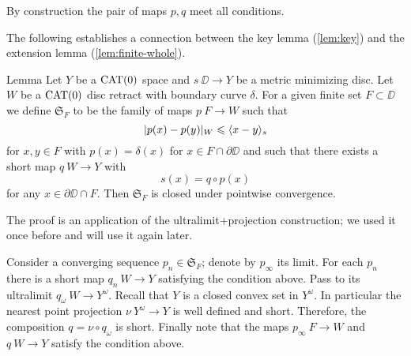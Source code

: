 By construction the pair of maps $p,q$ meet all conditions.
\qeds

The following establishes a connection between the 
key lemma (\ref{lem:key}) and the extension lemma (\ref{lem:finite-whole}).

\begin{thm}{Lemma}\label{lem:S-closed}
Let $Y$ be a $\mathop{\rm CAT}\nolimits(0)$ space and $s\:\DD\to Y$ 
be a metric minimizing disc. Let $W$ be a
$\mathop{\rm CAT}\nolimits(0)$ disc retract with boundary curve $\delta$. For a given 
finite set $F\subset \DD$ we define $\mathfrak{S}_F$ to be the family of maps  
 $p\:F\to W$ such that
\[|p(x)-p(y)|_W\leqslant \langle x-y\rangle_s\] 
for $x,y\in F$ with $p(x)=\delta(x)$ for $x\in F\cap \partial\DD$ and such that there exists
a short map $q\:W\to Y$ with
\[s(x)=q\circ p(x)\] 
for any $x\in\partial\DD\cap F$.
Then $\mathfrak{S}_F$ is closed under pointwise convergence. 
\end{thm}

The proof is an application of the ultralimit+projection construction;
we used it once before and will use it again later.

Consider a converging sequence $p_n\in  \mathfrak{S}_F$;
denote by $p_\infty$ its limit.
For each $p_n$ there is a short map $q_n\:W\to Y$ satisfying the condition above.
Pass to its ultralimit $q_\omega\:W\to Y^\omega$.
Recall that $Y$ is a closed convex set in $Y^\omega$.
In particular the nearest point projection $\nu\:Y^\omega\to Y$ is well defined and short.
Therefore, the composition $q=\nu\circ q_\omega$ is short.
Finally note that the maps $p_\infty\:F\to W$ and $q\:W\to Y$ satisfy the condition above.
\qeds

